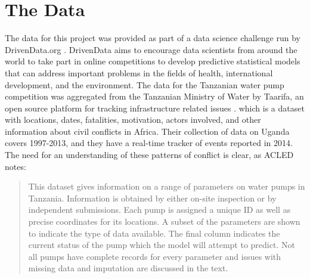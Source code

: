\documentclass{article} %
\begin{document}
\section{The Data}

The data for this project was provided as part of a data science challenge run by DrivenData.org \cite{DrivenData2015}. DrivenData aims to encourage data scientists from around the world to take part in online competitions to develop predictive statistical models that can address important problems in the fields of health, international development, and the environment. The data for the Tanzanian water pump competition was aggregated from the Tanzanian Ministry of Water by Taarifa, an open source platform for tracking infrastructure related issues \cite{Taarifa2015}.  which is a dataset with locations, dates, fatalities, motivation, actors involved, and other information about civil conflicts in Africa. Their collection of data on Uganda covers 1997-2013, and they have a real-time tracker of events reported in 2014.\cite{ACLED} The need for an understanding of these patterns of conflict is clear, as ACLED notes:

\begin{quote}
This dataset gives information on a range of parameters on water pumps in Tanzania. Information is obtained by either on-site inspection or by independent submissions. Each pump is assigned a unique ID as well as precise coordinates for its locations. A subset of the parameters are shown to indicate the type of data available. The final column indicates the current status of the pump which the model will attempt to predict. Not all pumps have complete records for every parameter and issues with missing data and imputation are discussed in the text.
\end{quote}
\end{document}
